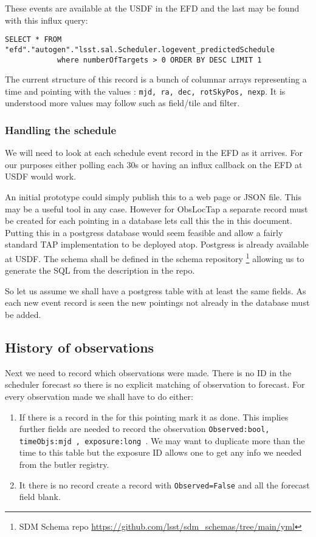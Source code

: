 These events are available at the USDF in the EFD and the last may be found with this influx query:
\begin{lstlisting}
SELECT * FROM "efd"."autogen"."lsst.sal.Scheduler.logevent_predictedSchedule
            where numberOfTargets > 0 ORDER BY DESC LIMIT 1
\end{lstlisting}

The current structure of this record is a bunch of columnar arrays representing a time and pointing with the
values : {\tt mjd, ra, dec, rotSkyPos, nexp}.
It is understood more values may follow such as field/tile and filter.

\subsubsection{Handling the schedule}
We will need to look at each schedule event record in the EFD as it arrives.
For our purposes either polling each 30s or having an influx callback on the EFD at USDF would
work.

An initial prototype could simply publish this to a web page or JSON file.
This may be a useful tool in any case.
However for ObsLocTap a separate record must be created for each pointing in a database lets call this the \DB in this document.
Putting this in a postgress database would seem feasible and allow a fairly standard TAP implementation to be deployed atop.
Postgress is already available at USDF.
The schema shall be  defined in the schema repository
\footnote{ SDM Schema repo \url{https://github.com/lsst/sdm_schemas/tree/main/yml}}
 allowing us to generate the SQL from the description in the repo.

So let us assume we shall have a postgress table with at least the same fields.
As each new event record is seen the new pointings not already in the database must be added.

\subsection{History of observations}
Next we need to record which observations were made.
There is no ID in the scheduler forecast so there is no explicit matching of observation to forecast.
For every observation made we shall have to do either:
\begin{enumerate}
\item If there is a record in the \DB for this pointing mark it as done. This implies further fields are needed to record the observation {\tt Observed:bool, timeObjs:mjd , exposure:long }. We may want to duplicate more than the time to this table but the exposure ID allows one to get any info we needed from the butler registry.
\item It there is no record create a record with {\tt Observed=False} and all the forecast field blank.
\end{enumerate}

